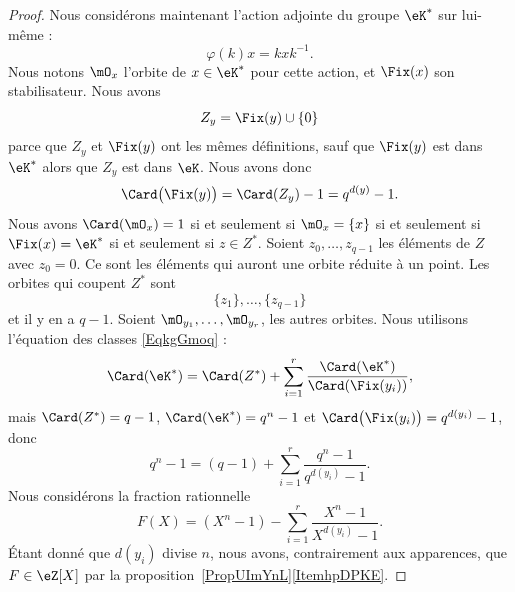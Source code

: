 \begin{proof}
    Nous considérons maintenant l'action adjointe du groupe \( \eK^*\) sur lui-même :
    \begin{equation}
        \varphi(k)x=kxk^{-1}.
    \end{equation}
    Nous notons \( \mO_x\) l'orbite de \( x\in \eK^*\) pour cette action, et \( \Fix(x)\) son stabilisateur. Nous avons
    \begin{equation}
        Z_y=\Fix(y)\cup\{ 0 \}
    \end{equation}
    parce que \( Z_y\) et \( \Fix(y)\) ont les mêmes définitions, sauf que \( \Fix(y)\) est dans \( \eK^*\) alors que \( Z_y\) est dans \( \eK\). Nous avons donc
    \begin{equation}
        \Card\big( \Fix(y) \big)=\Card(Z_y)-1=q^{d(y)}-1.
    \end{equation}
    Nous avons \( \Card(\mO_x)=1\) si et seulement si \( \mO_x=\{ x \}\) si et seulement si \( \Fix(x)=\eK^*\) si et seulement si \( z\in Z^*\). Soient \( z_0,\ldots, z_{q-1}\) les éléments de \( Z\) avec \( z_0=0\). Ce sont les éléments qui auront une orbite réduite à un point. Les orbites qui coupent \( Z^*\) sont
    \begin{equation}
        \{ z_1 \},\ldots, \{ z_{q-1} \}
    \end{equation}
    et il y en a \( q-1\). Soient \( \mO_{y_1},\ldots, \mO_{y_r}\), les autres orbites. Nous utilisons l'équation des classes \eqref{EqkgGmoq} :
    \begin{equation}
        \Card(\eK^*)=\Card(Z^*)+\sum_{i=1}^{r}\frac{ \Card(\eK^*) }{ \Card(\Fix(y_i)) },
    \end{equation}
    mais \( \Card(Z^*)=q-1\), \( \Card(\eK^*)=q^n-1\) et \( \Card\big( \Fix(y_i) \big)=q^{d(y_i)}-1\), donc
    \begin{equation}        \label{EqBPBDzE}
        q^n-1=(q-1)+\sum_{i=1}^{r}\frac{ q^n-1 }{ q^{d(y_i)}-1 }.
    \end{equation}
    Nous considérons la fraction rationnelle
    \begin{equation}        \label{EqATGciu}
        F(X)=(X^n-1)-\sum_{i=1}^{r}\frac{ X^n-1 }{ X^{d(y_i)}-1 }.
    \end{equation}
    Étant donné que \( d(y_i)\) divise \( n\), nous avons, contrairement aux apparences, que \( F\in \eZ[X]\) par la proposition~\ref{PropUImYnL}\ref{ItemhpDPKE}.


\end{proof}
